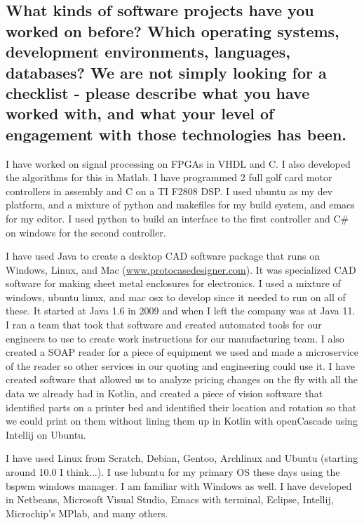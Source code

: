 \documentclass[letter,12pt]{article}
\begin{document}
\subsection{What kinds of software projects have you worked on before? Which operating systems, development environments, languages, databases?  We are not simply looking for a checklist - please describe what you have worked with, and what your level of engagement with those technologies has been.}
I have worked on signal processing on FPGAs in VHDL and C. I also developed the algorithms for this in Matlab. I have programmed 2 full golf card motor controllers in assembly and C on a TI F2808 DSP. I used ubuntu as my dev platform, and a mixture of python and makefiles for my build system, and emacs for my editor. I used python to build an interface to the first controller and C\# on windows for the second controller.

I have used Java to create a desktop CAD software package that runs on Windows, Linux, and Mac (\href{http://www.protocasedesigner.com}{www.protocasedesigner.com}). It was specialized CAD software for making sheet metal enclosures for electronics. I used a mixture of windows, ubuntu linux, and mac osx to develop since it needed to run on all of these. It started at Java 1.6 in 2009 and when I left the company was at Java 11. I ran a team that took that software and created automated tools for our engineers to use to create work instructions for our manufacturing team. I also created a SOAP reader for a piece of equipment we used and made a microservice of the reader so other services in our quoting and engineering could use it. I have created software that allowed us to analyze pricing changes on the fly with all the data we already had in Kotlin, and created a piece of vision software that identified parts on a printer bed and identified their location and rotation so that we could print on them without lining them up in Kotlin with openCascade using Intellij on Ubuntu.

I have used Linux from Scratch, Debian, Gentoo, Archlinux and Ubuntu (starting around 10.0 I think...). I use lubuntu for my primary OS these days using the bspwm windows manager. I am familiar with Windows as well. I have developed in Netbeans, Microsoft Visual Studio, Emacs with terminal, Eclipse, Intellij, Microchip's MPlab, and many others.
\end{document}
